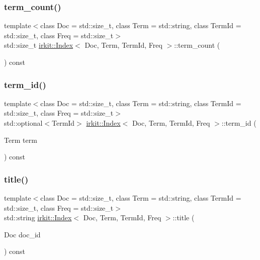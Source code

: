 \mbox{\label{classirkit_1_1Index_a3051984667589401814296f54e72e32c}} 
\subsubsection{\texorpdfstring{term\+\_\+count()}{term\_count()}}
{\footnotesize\ttfamily template$<$class Doc  = std\+::size\+\_\+t, class Term  = std\+::string, class Term\+Id  = std\+::size\+\_\+t, class Freq  = std\+::size\+\_\+t$>$ \\
std\+::size\+\_\+t \mbox{\hyperlink{classirkit_1_1Index}{irkit\+::\+Index}}$<$ Doc, Term, Term\+Id, Freq $>$\+::term\+\_\+count (\begin{DoxyParamCaption}{ }\end{DoxyParamCaption}) const\hspace{0.3cm}{\ttfamily [inline]}}

\mbox{\label{classirkit_1_1Index_a753cf658f5464ae7f19e8e12831abc65}} 
\subsubsection{\texorpdfstring{term\+\_\+id()}{term\_id()}}
{\footnotesize\ttfamily template$<$class Doc  = std\+::size\+\_\+t, class Term  = std\+::string, class Term\+Id  = std\+::size\+\_\+t, class Freq  = std\+::size\+\_\+t$>$ \\
std\+::optional$<$Term\+Id$>$ \mbox{\hyperlink{classirkit_1_1Index}{irkit\+::\+Index}}$<$ Doc, Term, Term\+Id, Freq $>$\+::term\+\_\+id (\begin{DoxyParamCaption}\item[{Term}]{term }\end{DoxyParamCaption}) const\hspace{0.3cm}{\ttfamily [inline]}}

\mbox{\label{classirkit_1_1Index_a6a4d5f7860e2359b89270d20302e6f0b}} 
\subsubsection{\texorpdfstring{title()}{title()}}
{\footnotesize\ttfamily template$<$class Doc  = std\+::size\+\_\+t, class Term  = std\+::string, class Term\+Id  = std\+::size\+\_\+t, class Freq  = std\+::size\+\_\+t$>$ \\
std\+::string \mbox{\hyperlink{classirkit_1_1Index}{irkit\+::\+Index}}$<$ Doc, Term, Term\+Id, Freq $>$\+::title (\begin{DoxyParamCaption}\item[{Doc}]{doc\+\_\+id }\end{DoxyParamCaption}) const\hspace{0.3cm}{\ttfamily [inline]}}

